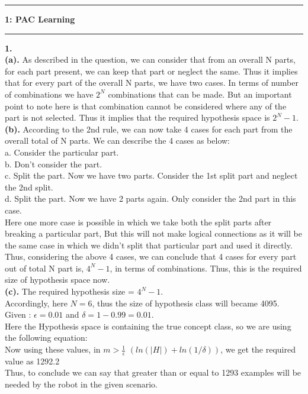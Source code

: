 \documentclass[11pt]{article}
\newcommand\question[2]{\vspace{.25in}\hrule\textbf{#1: #2}\vspace{.5em}\hrule\vspace{.10in}}
\begin{document}
\raggedright
\newcommand\NAME{Aishwarya Asesh}  %
\newcommand\UID{u1063384}     %
\newcommand\HWNUM{4}              %



\question{1}{PAC Learning}
{\bf 1.} \\{\bf (a).} As described in the question, we can consider that from an overall N parts, for each part present, we can keep that part or neglect the same. Thus it implies that for every part of the overall N parts, we have two cases. In terms of number of combinations we have $2^{N}$ combinations that can be made. But an important point to note here is that combination cannot be considered where any of the part is not selected. Thus it implies that the required hypothesis space is $2^{N} - 1$.\\[10pt]
{\bf (b).} According to the 2nd rule, we can now take 4 cases for each part from the overall total of N parts. We can describe the 4 cases as below:\\
a. Consider the particular part.\\
b. Don't consider the part.\\
c. Split the part. Now we have two parts. Consider the 1st split part and neglect the 2nd split.\\
d. Split the part. Now we have 2 parts again. Only consider the 2nd part in this case.\\
Here one more case is possible in which we take both the split parts after breaking a particular part, But this will not make logical connections as it will be the same case in which we didn't split that particular part and used it directly.\\
Thus, considering the above 4 cases, we can conclude that 4 cases for every part out of total N part is, $4^{N}-1$, in terms of combinations. Thus, this is the required size of hypothesis space now.\\[10pt]
{\bf (c).} The required hypothesis size = $4^{N}-1$.\\
Accordingly, here $N=6$, thus the size of hypothesis class will became 4095.\\
Given : $\epsilon= 0.01$ and $\delta = 1-0.99=0.01$.\\
Here the Hypothesis space is containing the true concept class, so we are using the following equation:\\ 
Now using these values, in $m > \frac {1}{\epsilon}$ $(ln (|H|) + ln(1/ \delta))$, we get the required value as 1292.2\\
Thus, to conclude we can say that greater than or equal to 1293 examples will be needed by the robot in the given scenario.\\[15pt]
\end{document}
